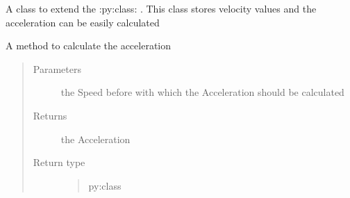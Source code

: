 \documentclass[letterpaper,10pt,english]{sphinxmanual}
\begin{document}
\begin{fulllineitems}
\label{\detokenize{data:lib.data.Speed}}
A class to extend the :py:class: . This class stores velocity values and the
acceleration can be easily calculated

\begin{fulllineitems}
\label{\detokenize{data:lib.data.Speed.acceleration}}
A method to calculate the acceleration
\begin{quote}\begin{description}
\item[{Parameters}] \leavevmode
{} \textendash{} the Speed before with which the Acceleration should be calculated

\item[{Returns}] \leavevmode
the Acceleration

\item[{Return type}] \leavevmode
\begin{quote}\begin{description}
\item[{py:class}] \leavevmode
{}

\end{description}\end{quote}


\end{description}\end{quote}

\end{fulllineitems}


\end{fulllineitems}

\end{document}
